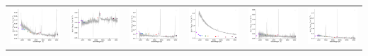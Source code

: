 \begin{center}
\begin{longtable}{l l l l l l }
    \includegraphics[width=0.3\linewidth, clip]{Figs/Figs-sdss/spec-0983-52443-0348-STRIPE82-0104-019279.pdf} & \includegraphics[width=0.3\linewidth, clip]{Figs/Figs-sdss/spec-0983-52443-0459-STRIPE82-0106-052252.pdf} & \includegraphics[width=0.3\linewidth, clip]{Figs/Figs-sdss/spec-0984-52442-0311-STRIPE82-0105-069446.pdf} & \includegraphics[width=0.3\linewidth, clip]{Figs/Figs-sdss/spec-0984-52442-0533-STRIPE82-0108-039253.pdf} & \includegraphics[width=0.3\linewidth, clip]{Figs/Figs-sdss/spec-0990-52465-0605-STRIPE82-0124-071122.pdf} & \includegraphics[width=0.3\linewidth, clip]{Figs/Figs-sdss/spec-1024-52826-0028-STRIPE82-0109-049060.pdf} \\

\end{longtable}
\end{center}
